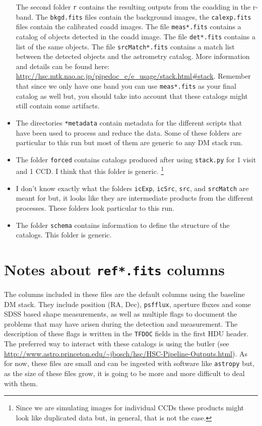 \documentclass{article}
\begin{document}
\begin{itemize}
The second folder \texttt{r} contains the resulting outputs from the coadding in the r-band. The \texttt{bkgd.fits} files contain the background images, the \texttt{calexp.fits} files contain the calibrated coadd images. The file \texttt{meas*.fits} contains a catalog of objects detected in the coadd image. The file \texttt{det*.fits} contains a list of the same objects. The file \texttt{srcMatch*.fits} contains a match list between the detected objects and the astrometry catalog. More information and details can be found here: \url{http://hsc.mtk.nao.ac.jp/pipedoc_e/e_usage/stack.html#stack}. Remember that since we only have one band you can use \texttt{meas*.fits} as your final catalog as well but, you should take into account that these catalogs might still contain some artifacts.

\item The directories \texttt{*metadata} contain metadata for the different scripts that have been used to process and reduce the data. Some of these folders are particular to this run but most of them are generic to any DM stack run.
\item  The folder \texttt{forced} contains catalogs produced after using \texttt{stack.py} for 1 visit and 1 CCD. I think that this folder is generic. \footnote{Since we are simulating images for individual CCDs these products might look like duplicated data but, in general, that is not the case.}
\item I don't know exactly what the folders \texttt{icExp}, \texttt{icSrc}, \texttt{src}, and \texttt{srcMatch} are meant for but, it looks like they are intermediate products from the different processes. These folders look particular to this run.
\item The folder \texttt{schema} contains information to define the structure of the catalogs. This folder is generic.
\end{itemize}
\section{Notes about \texttt{ref*.fits} columns}
The columns included in these files are the default columns using the baseline DM stack. They include position (RA, Dec), \texttt{psfflux}, aperture fluxes and some SDSS based shape measurements, as well as multiple flags to document the problems that may have arisen during the detection and measurement. The description of these flags is written in the \texttt{TFDOC} fields in the first HDU header. The preferred way to interact with these catalogs is using the butler (see \url{http://www.astro.princeton.edu/~jbosch/hsc/HSC-Pipeline-Outputs.html}). As for now, these files are small and can be ingested with software like \texttt{astropy} but, as the size of these files grow, it is going to be more and more difficult to deal with them.
\end{document}
